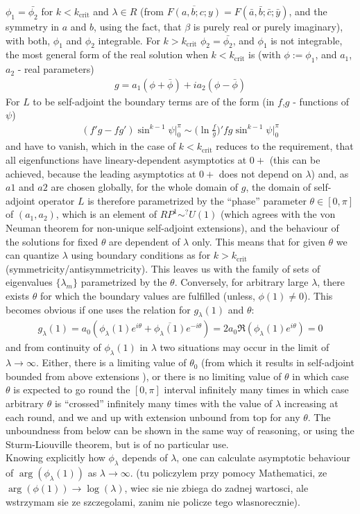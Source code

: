 \documentclass[
a4paper,%
10pt,%
titlepage,%
twoside%
]{article}
\begin{document}
$\phi_1=\bar{\phi_2}$ for $k<k_\text{crit}$ and $\lambda\in R$ (from
$\overline{F(a,b;c;y)}=F(\bar{a},\bar{b};\bar{c};\bar{y})$, and the
symmetry in $a$ and $b$, using the fact, that $\beta$ is purely real
or purely imaginary), with both, $\phi_1$ and $\phi_2$ integrable. For
$k>k_\text{crit}$ $\phi_2=\bar{\phi_2}$, and $\phi_1$ is not
integrable, the most general form of the real solution when
$k<k_\text{crit}$ is (with $\phi:=\phi_1$, and $a_1$, $a_2$ - real
parameters)
\begin{gather}
  g=a_1(\phi+\bar\phi)+i a_2(\phi-\bar\phi)
\end{gather}
For $L$ to be self-adjoint the boundary terms are of the form
(in $f$,$g$ - functions of $\psi$)
\begin{gather}
  (f'g-fg')\sin^{k-1}\psi\big|^\pi_0\sim \bigg(\ln \frac{f}{g}\bigg)'fg\sin^{k-1}\psi\big|_0^\pi
\end{gather}
and have to vanish, which in the case of $k<k_\text{crit}$ reduces to
the requirement, that all eigenfunctions have lineary-dependent
asymptotics at $0+$ (this can be achieved, because the leading
asymptotics at $0+$ does not depend on $\lambda$) and, as $a1$ and
$a2$ are chosen globally, for the whole domain of $g$, the domain of
self-adjoint operator $L$ is therefore parametrized by the ``phase''
parameter $\theta\in[0,\pi]$ of $(a_1,a_2)$, which is an element of
$RP^1\sim^?U(1)$ (which agrees with the von Neuman theorem for
non-unique self-adjoint extensions), and the behaviour of the solutions
for fixed $\theta$ are dependent of $\lambda$ only. This means that
for given $\theta$ we can quantize $\lambda$ using boundary conditions
as for $k>k_\text{crit}$ (symmetricity/antisymmetricity). This leaves
us with the family of sets of eigenvalues $\{\lambda_m\}$ parametrized
by the $\theta$. Conversely, for arbitrary large $\lambda$, there
exists $\theta$ for which the boundary values are fulfilled (unless,
$\phi(1)\ne0$). This becomes obvious if one uses the relation for
$g_\lambda(1)$ and $\theta$:
\begin{gather}
  g_\lambda(1)=a_0(\phi_\lambda(1)
  e^{i\theta}+\overline{\phi_\lambda(1)} e^{-i\theta})=2a_0\Re
  (\phi_\lambda(1) e^{i\theta})=0
\end{gather}
and from continuity of $\phi_\lambda(1)$ in $\lambda$ two situations
may occur in the limit of $\lambda\rightarrow\infty$. Either, there is
a limiting value of $\theta_0$ (from which it results in self-adjoint
bounded from above extensions ), or there is no limiting value of
$\theta$ in which case $\theta$ is expected to go round the $[0,\pi]$
interval infinitely many times in which case arbitrary $\theta$ is
``crossed'' infinitely many times with the value of $\lambda$
increasing at each round, and we and up with extension unbound from
top for any $\theta$. The unboundness from below can be shown in the
same way of reasoning, or using the Sturm-Liouville theorem, but is of
no particular use.
\\
Knowing explicitly how $\phi_\lambda$ depends of $\lambda$, one can
calculate asymptotic behaviour of $\arg(\phi_\lambda(1))$ as
$\lambda\rightarrow\infty$. (tu policzylem przy pomocy Mathematici, ze
$\arg(\phi(1))\rightarrow\log(\lambda)$, wiec sie nie zbiega do zadnej
wartosci, ale wstrzymam sie ze szczegolami, zanim nie policze tego
wlasnorecznie).
\end{document}

